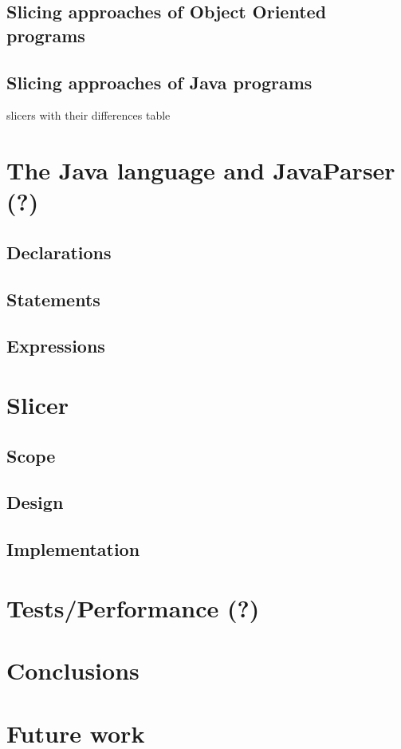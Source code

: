\documentclass[a4paper]{article}
\begin{document}
\subsection{Slicing approaches of Object Oriented programs}

\subsection{Slicing approaches of Java programs}

slicers with their differences table

\section{The Java language and JavaParser (?)}

\subsection{Declarations}

\subsection{Statements}

\subsection{Expressions}

\section{Slicer}

\subsection{Scope}

\subsection{Design}

\subsection{Implementation}

\section{Tests/Performance (?)}

\section{Conclusions}

\section{Future work}

\newpage


\end{document}
